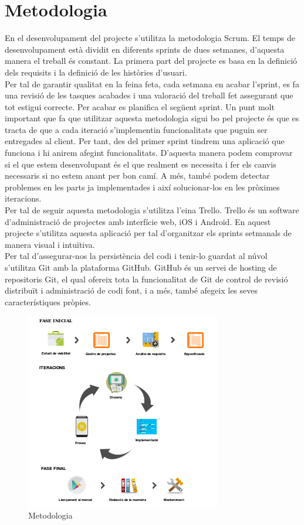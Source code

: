 \section{Metodologia}

En el desenvolupament del projecte s’utilitza la metodologia Scrum. El temps de desenvolupament està dividit en diferents sprints de dues setmanes, d’aquesta manera el treball és constant. La primera part del projecte es basa en la definició dels requisits i la definició de les històries d’usuari.\\

Per tal de garantir qualitat en la feina feta, cada setmana en acabar l’sprint, es fa una revisió de les tasques acabades i una valoració del treball fet assegurant que tot estigui correcte. Per acabar es planifica el següent sprint. Un punt molt important que fa que utilitzar aquesta metodologia sigui bo pel projecte és que es tracta de que a cada iteració s’implementin funcionalitats que puguin ser entregades al client. Per
tant, des del primer sprint tindrem una aplicació que funciona i hi anirem afegint funcionalitats. D’aquesta manera podem comprovar si el que estem desenvolupant és el que realment es necessita i fer els canvis necessaris si no estem anant per bon camí. A més, també podem detectar problemes en les parts ja implementades i així solucionar-los en les pròximes iteracions.\\

Per tal de seguir aquesta metodologia s’utilitza l’eina Trello. Trello és un software d’administració de projectes amb interfície web, iOS i Android. En aquest projecte s’utilitza aquesta aplicació per tal d’organitzar els sprints setmanals de manera visual i intuïtiva.\\

Per tal d’assegurar-nos la persistència del codi i tenir-lo guardat al núvol s’utilitza Git amb la plataforma GitHub. GitHub és un servei de hosting de repositoris Git, el qual ofereix tota la funcionalitat de Git de control de revisió distribuït i administració de codi font, i a més, també afegeix les seves característiques pròpies.

\begin{figure}[!h]
\centering
\includegraphics[scale=1]{Figures/metodologia.png}
\caption{Metodologia}
\end{figure}



